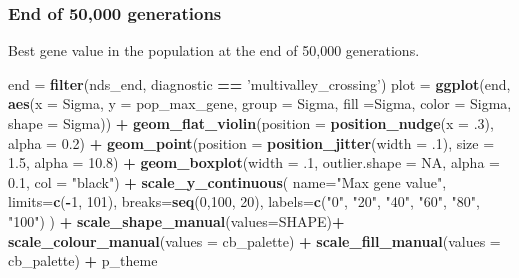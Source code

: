 \documentclass[]{book}
\newenvironment{Shaded}{\begin{snugshade}}{\end{snugshade}}
\newcommand{\DataTypeTok}[1]{\textcolor[rgb]{0.13,0.29,0.53}{#1}}
\newcommand{\DecValTok}[1]{\textcolor[rgb]{0.00,0.00,0.81}{#1}}
\newcommand{\FloatTok}[1]{\textcolor[rgb]{0.00,0.00,0.81}{#1}}
\newcommand{\KeywordTok}[1]{\textcolor[rgb]{0.13,0.29,0.53}{\textbf{#1}}}
\newcommand{\NormalTok}[1]{#1}
\newcommand{\OperatorTok}[1]{\textcolor[rgb]{0.81,0.36,0.00}{\textbf{#1}}}
\newcommand{\OtherTok}[1]{\textcolor[rgb]{0.56,0.35,0.01}{#1}}
\newcommand{\StringTok}[1]{\textcolor[rgb]{0.31,0.60,0.02}{#1}}
\begin{document}
\hypertarget{end-of-50000-generations-37}{%
\subsubsection{End of 50,000 generations}\label{end-of-50000-generations-37}}

Best gene value in the population at the end of 50,000 generations.

\begin{Shaded}
\begin{Highlighting}[]
\NormalTok{end =}\StringTok{ }\KeywordTok{filter}\NormalTok{(nds_end, diagnostic }\OperatorTok{==}\StringTok{ 'multivalley_crossing'}\NormalTok{)}
\NormalTok{plot =}\StringTok{ }\KeywordTok{ggplot}\NormalTok{(end, }\KeywordTok{aes}\NormalTok{(}\DataTypeTok{x =}\NormalTok{ Sigma, }\DataTypeTok{y =}\NormalTok{ pop_max_gene, }\DataTypeTok{group =}\NormalTok{ Sigma, }\DataTypeTok{fill =}\NormalTok{Sigma, }\DataTypeTok{color =}\NormalTok{ Sigma, }\DataTypeTok{shape =}\NormalTok{ Sigma)) }\OperatorTok{+}
\StringTok{  }\KeywordTok{geom_flat_violin}\NormalTok{(}\DataTypeTok{position =} \KeywordTok{position_nudge}\NormalTok{(}\DataTypeTok{x =} \FloatTok{.3}\NormalTok{), }\DataTypeTok{alpha =} \FloatTok{0.2}\NormalTok{) }\OperatorTok{+}
\StringTok{  }\KeywordTok{geom_point}\NormalTok{(}\DataTypeTok{position =} \KeywordTok{position_jitter}\NormalTok{(}\DataTypeTok{width =} \FloatTok{.1}\NormalTok{), }\DataTypeTok{size =} \FloatTok{1.5}\NormalTok{, }\DataTypeTok{alpha =} \FloatTok{10.8}\NormalTok{) }\OperatorTok{+}
\StringTok{  }\KeywordTok{geom_boxplot}\NormalTok{(}\DataTypeTok{width =} \FloatTok{.1}\NormalTok{, }\DataTypeTok{outlier.shape =} \OtherTok{NA}\NormalTok{, }\DataTypeTok{alpha =} \FloatTok{0.1}\NormalTok{, }\DataTypeTok{col =} \StringTok{"black"}\NormalTok{) }\OperatorTok{+}
\StringTok{  }\KeywordTok{scale_y_continuous}\NormalTok{(}
      \DataTypeTok{name=}\StringTok{"Max gene value"}\NormalTok{,}
      \DataTypeTok{limits=}\KeywordTok{c}\NormalTok{(}\OperatorTok{-}\DecValTok{1}\NormalTok{, }\DecValTok{101}\NormalTok{),}
      \DataTypeTok{breaks=}\KeywordTok{seq}\NormalTok{(}\DecValTok{0}\NormalTok{,}\DecValTok{100}\NormalTok{, }\DecValTok{20}\NormalTok{),}
      \DataTypeTok{labels=}\KeywordTok{c}\NormalTok{(}\StringTok{"0"}\NormalTok{, }\StringTok{"20"}\NormalTok{, }\StringTok{"40"}\NormalTok{, }\StringTok{"60"}\NormalTok{, }\StringTok{"80"}\NormalTok{, }\StringTok{"100"}\NormalTok{)}
\NormalTok{  ) }\OperatorTok{+}
\StringTok{  }\KeywordTok{scale_shape_manual}\NormalTok{(}\DataTypeTok{values=}\NormalTok{SHAPE)}\OperatorTok{+}
\StringTok{  }\KeywordTok{scale_colour_manual}\NormalTok{(}\DataTypeTok{values =}\NormalTok{ cb_palette) }\OperatorTok{+}
\StringTok{  }\KeywordTok{scale_fill_manual}\NormalTok{(}\DataTypeTok{values =}\NormalTok{ cb_palette) }\OperatorTok{+}
\StringTok{  }\NormalTok{p_theme}


\end{Highlighting}
\end{Shaded}
\end{document}
